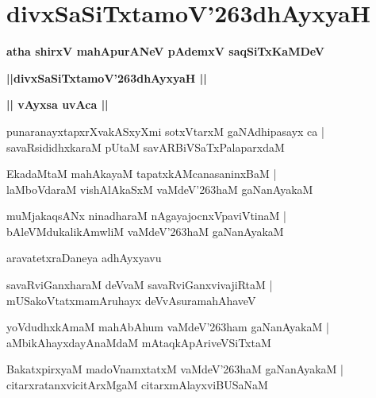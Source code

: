 \documentclass[twoside,12pt,openright]{book}
\def\S{\char'263}
\newcounter{shloka}[chapter]
\def\uvaca#1{\centerline{{\large\textbf{#1}}}}
\begin{document}
\chapter{divxSaSiTxtamoV\S dhAyxyaH}

\begin{center}
{\LARGE\bfseries atha shirxV mahApurANeV pAdemxV saqSiTxKaMDeV}
\end{center}

\begin{center}
{\LARGE\bfseries ||divxSaSiTxtamoV\S dhAyxyaH || }
\end{center}

\uvaca{|| vAyxsa uvAca ||}

\begin{shloka}%
punaranayxtapxrXvakASxyXmi sotxVtarxM gaNAdhipasayx ca |\\
savaRsididhxkaraM pUtaM savARBiVSaTxPalaparxdaM 
\end{shloka}

\begin{shloka}%
EkadaMtaM mahAkayaM tapatxkAMcanasaninxBaM |\\
laMboVdaraM vishAlAkaSxM vaMdeV\S haM gaNanAyakaM 
\end{shloka}

\begin{shloka}%
muMjakaqsANx ninadharaM nAgayajocnxVpaviVtinaM |\\
bAleVMdukalikAmwliM vaMdeV\S haM gaNanAyakaM 
\end{shloka}

\begin{center}
aravatetxraDaneya adhAyxyavu
\end{center}

\begin{shloka}%
savaRviGanxharaM deVvaM savaRviGanxvivajiRtaM |\\
mUSakoVtatxmamAruhayx deVvAsuramahAhaveV 
\end{shloka}

\begin{shloka}%
yoVdudhxkAmaM mahAbAhum vaMdeV\S ham gaNanAyakaM |\\
aMbikAhayxdayAnaMdaM mAtaqkApAriveVSiTxtaM 
\end{shloka}

\begin{shloka}%
BakatxpirxyaM madoVnamxtatxM vaMdeV\S haM gaNanAyakaM |\\
citarxratanxvicitArxMgaM citarxmAlayxviBUSaNaM 
\end{shloka}
\end{document}
